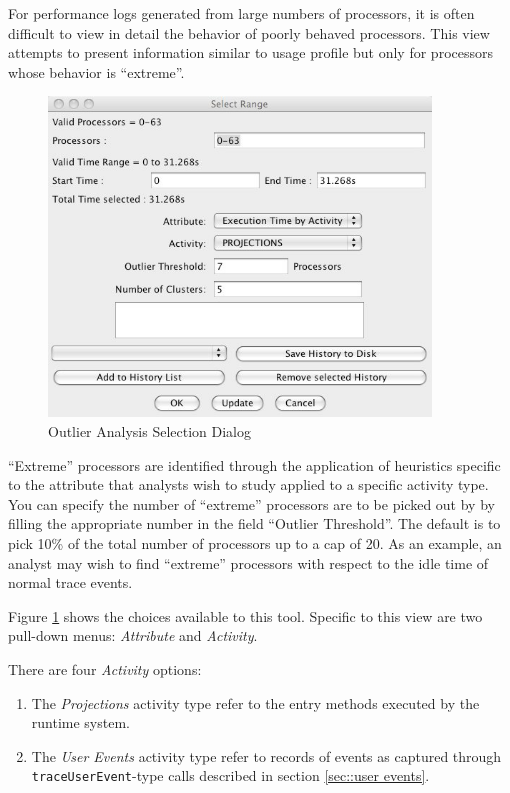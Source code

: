 \label{sec::outlier}

For performance logs generated from large numbers of processors, it is
often difficult to view in detail the behavior of poorly behaved
processors. This view attempts to present information similar to usage
profile but only for processors whose behavior is ``extreme''.

\begin{figure}[htb]
\center
\includegraphics[width=4.0in]{fig/outlier_dialog}
\caption{Outlier Analysis Selection Dialog}
\label{outlier dialog}
\end{figure}

``Extreme'' processors are identified through the application of
heuristics specific to the attribute that analysts wish to study
applied to a specific activity type. You can specify the number of
``extreme'' processors are to be picked out by \projections{} by
filling the appropriate number in the field ``Outlier Threshold''. The
default is to pick 10\% of the total number of processors up to a cap
of 20. As an example, an analyst may wish to find ``extreme''
processors with respect to the idle time of normal \charmpp{} trace
events.

Figure \ref{outlier dialog} shows the choices available to this
tool. Specific to this view are two pull-down menus: {\em Attribute}
and {\em Activity}.

There are four {\em Activity} options:
\begin{enumerate}
\item The {\em Projections} activity type refer to the entry methods 
executed by the \charmpp{} runtime system.
\item The {\em User Events} activity type refer to records of events
as captured through {\tt traceUserEvent}-type calls described in
section \ref{sec::user events}.
\end{enumerate}

